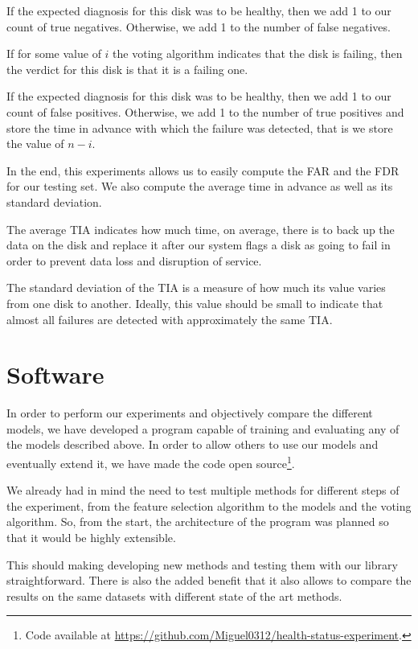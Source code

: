 If the expected diagnosis for this disk was to be healthy, then we add 1 to our count of true negatives.
Otherwise, we add 1 to the number of false negatives.

If for some value of $i$ the voting algorithm indicates that the disk is failing, then the verdict for this disk is that it is a failing one.

If the expected diagnosis for this disk was to be healthy, then we add 1 to our count of false positives.
Otherwise, we add 1 to the number of true positives and store the time in advance with which the failure was detected, that is we store the value of $n-i$.

In the end, this experiments allows us to easily compute the FAR and the FDR for our testing set.
We also compute the average time in advance as well as its standard deviation.

The average TIA indicates how much time, on average, there is to back up the data on the disk and replace it after our system flags a disk as going to fail in order to prevent data loss and disruption of service. 

The standard deviation of the TIA is a measure of how much its value varies from one disk to another.
Ideally, this value should be small to indicate that almost all failures are detected with approximately the same TIA.

\section{Software}

In order to perform our experiments and objectively compare the different models, we have developed a program capable of training and evaluating any of the models described above.
In order to allow others to use our models and eventually extend it, we have made the code open source\footnote{Code available at \url{https://github.com/Miguel0312/health-status-experiment}.}.

We already had in mind the need to test multiple methods for different steps of the experiment, from the feature selection algorithm to the models and the voting algorithm.
So, from the start, the architecture of the program was planned so that it would be highly extensible.

This should making developing new methods and testing them with our library straightforward.
There is also the added benefit that it also allows to compare the results on the same datasets with different state of the art methods.

